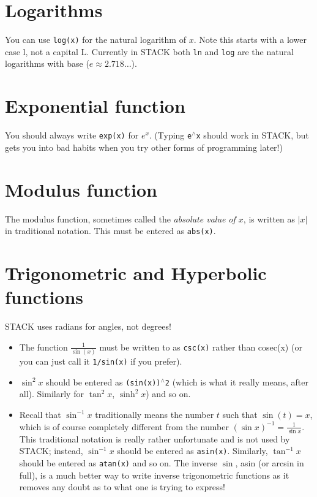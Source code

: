 \documentclass[a4paper]{article}
\newcommand{\stack}[1]{{\color{red}\tt #1}}
\begin{document}
\begin{multicols}{2}
\section*{Logarithms}
You can use \stack{log(x)} for the natural logarithm of $x$. Note this starts with a lower case l, not a capital L. Currently in STACK both \stack{ln} and \stack{log} are the natural logarithms with base ($e \approx 2.718 \dots$).

\section*{Exponential function}
You should always write \stack{exp(x)} for $e^x$. (Typing \stack{e$^{\wedge}$x} should work in STACK, but gets you into bad habits when you try other forms of programming later!)

\section*{Modulus function}
The modulus function, sometimes called the {\em absolute value of $x$}, is written as $|x|$ in traditional notation. This must be entered as \stack{abs(x)}.

\section*{Trigonometric and Hyperbolic functions}
STACK uses radians for angles, not degrees!
\begin{itemize}
\item The function \(\frac{1}{\sin(x)}\) must be written to as \stack{csc(x)} rather than cosec(x) (or you can just call it \stack{1/sin(x)} if you prefer).
\item $\sin^2{x}$ should be entered as \stack{(sin(x))$^{\wedge}$2} (which is what it really means, after all). Similarly for $\tan^2{x}$, $\sinh^2{x}$) and so on.
\item Recall that $\sin^{-1}{x}$ traditionally means the number $t$ such that $\sin(t) = x$, which is of course completely different from the number $(\sin{x})^{-1} = \frac{1}{\sin{x}}$. This traditional notation is really rather unfortunate and is not used by STACK; instead, $\sin^{-1}{x}$ should be entered as \stack{asin(x)}. Similarly, $\tan^{-1}{x}$ should be entered as \stack{atan(x)} and so on. The inverse $\sin$, asin (or arcsin in full), is a much better way to write inverse trigonometric functions as it removes any doubt as to what one is trying to express!
\end{itemize}


\end{multicols}
\end{document}
